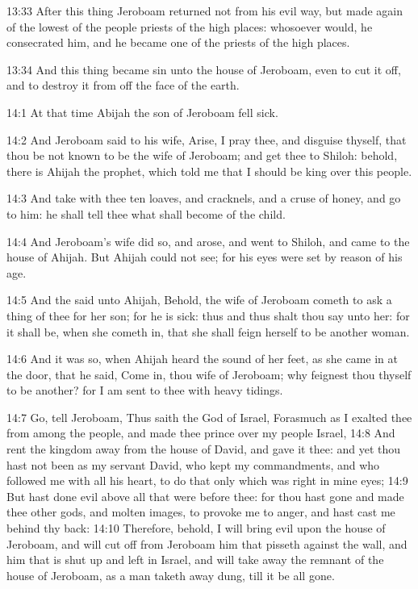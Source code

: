 13:33 After this thing Jeroboam returned not from his evil way, but
made again of the lowest of the people priests of the high places:
whosoever would, he consecrated him, and he became one of the priests
of the high places.

13:34 And this thing became sin unto the house of Jeroboam, even to
cut it off, and to destroy it from off the face of the earth.

14:1 At that time Abijah the son of Jeroboam fell sick.

14:2 And Jeroboam said to his wife, Arise, I pray thee, and disguise
thyself, that thou be not known to be the wife of Jeroboam; and get
thee to Shiloh: behold, there is Ahijah the prophet, which told me
that I should be king over this people.

14:3 And take with thee ten loaves, and cracknels, and a cruse of
honey, and go to him: he shall tell thee what shall become of the
child.

14:4 And Jeroboam's wife did so, and arose, and went to Shiloh, and
came to the house of Ahijah. But Ahijah could not see; for his eyes
were set by reason of his age.

14:5 And the \LORD said unto Ahijah, Behold, the wife of Jeroboam
cometh to ask a thing of thee for her son; for he is sick: thus and
thus shalt thou say unto her: for it shall be, when she cometh in,
that she shall feign herself to be another woman.

14:6 And it was so, when Ahijah heard the sound of her feet, as she
came in at the door, that he said, Come in, thou wife of Jeroboam; why
feignest thou thyself to be another? for I am sent to thee with heavy
tidings.

14:7 Go, tell Jeroboam, Thus saith the \LORD God of Israel, Forasmuch
as I exalted thee from among the people, and made thee prince over my
people Israel, 14:8 And rent the kingdom away from the house of David,
and gave it thee: and yet thou hast not been as my servant David, who
kept my commandments, and who followed me with all his heart, to do
that only which was right in mine eyes; 14:9 But hast done evil above
all that were before thee: for thou hast gone and made thee other
gods, and molten images, to provoke me to anger, and hast cast me
behind thy back: 14:10 Therefore, behold, I will bring evil upon the
house of Jeroboam, and will cut off from Jeroboam him that pisseth
against the wall, and him that is shut up and left in Israel, and will
take away the remnant of the house of Jeroboam, as a man taketh away
dung, till it be all gone.

